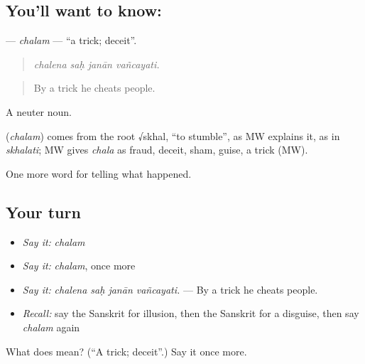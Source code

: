 \subsection*{You'll want to know: }
\textbf{} — \emph{chalam} — \textquotedblleft{}a trick; deceit\textquotedblright{}.

\begin{quote}
   
\end{quote}

\begin{quote}
\emph{chalena saḥ janān vañcayati.}
\end{quote}

\begin{quote}
By a trick he cheats people.
\end{quote}

A neuter noun.

\begin{cousinweb}
\textbf{} (\emph{chalam}) comes from the root √skhal, \textquotedblleft{}to stumble\textquotedblright{}, as MW explains it, as in \emph{skhalati}; MW gives \emph{chala} as fraud, deceit, sham, guise, a trick (MW).
\end{cousinweb}

\begin{grammarlens}[title={What you've built}]
One more word for telling what happened.
\end{grammarlens}

\subsection*{Your turn}
\begin{itemize}
\raggedright
  \item \emph{Say it:} \emph{chalam}
  \item \emph{Say it:} \emph{chalam}, once more
  \item \emph{Say it:} \emph{chalena saḥ janān vañcayati.} — By a trick he cheats people.
  \item \emph{Recall:} say the Sanskrit for illusion, then the Sanskrit for a disguise, then say \emph{chalam} again
\end{itemize}

\begin{tcolorbox}[breakable,colback=teal!4,colframe=teal!35!black,title={Before you move on}]
What does  mean? (\textquotedblleft{}A trick; deceit\textquotedblright{}.) Say it once more.
\end{tcolorbox}
